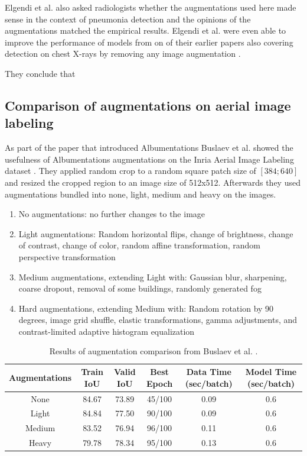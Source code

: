 \documentclass[10pt]{book}
\begin{document}
Elgendi et al. also asked radiologists whether the augmentations used here made sense in the context of pneumonia detection and the opinions of the augmentations matched the empirical results. Elgendi et al. were even able to improve the performance of models from on of their earlier papers also covering detection on chest X-rays by removing any image augmentation \cite{elgendi2020performance, elgendi2021effectiveness}.

They conclude that \cite[optimization over each geometric augmentation is needed. For example, defining an “acceptable” range of rotation.]{elgendi2021effectiveness}

\subsection{Comparison of augmentations on aerial image labeling}

As part of the paper that introduced Albumentations Buslaev et al. showed the usefulness of Albumentations augmentations on the Inria Aerial Image Labeling dataset \cite{info11020125,maggiori2017can}. They applied random crop to a random square patch size of $[384;640]$ and resized the cropped region to an image size of 512x512. Afterwards they used augmentations bundled into none, light, medium and heavy on the images.

\begin{enumerate}
  \item No augmentations: no further changes to the image
  \item Light augmentations: Random horizontal flips, change of brightness, change of contrast, change of color, random affine transformation, random perspective transformation
  \item Medium augmentations, extending Light with: Gaussian blur, sharpening, coarse dropout, removal of some buildings, randomly generated fog
  \item Hard augmentations, extending Medium with: Random rotation by 90 degrees, image grid shuffle, elastic transformations, gamma adjustments, and contrast-limited adaptive histogram equalization
\end{enumerate}

\begin{table}
  \begin{tabular}{ c c c c c c }
   Augmentations & Train IoU & Valid IoU & Best Epoch & Data Time (sec/batch) & Model Time (sec/batch) \\ 
   \hline
   None & 84.67 & 73.89 & 45/100 & 0.09 & 0.6\\
   Light & 84.84 & 77.50 & 90/100 & 0.09 & 0.6\\
   Medium & 83.52 & 76.94 & 96/100 & 0.11 & 0.6\\
   Heavy & 79.78 & 78.34 & 95/100 & 0.13 & 0.6\\
   \hline
  \end{tabular}
  \caption{\label{tab:alb-iou}Results of augmentation comparison from Buslaev et al. \cite{info11020125}.}
\end{table}
\end{document}
